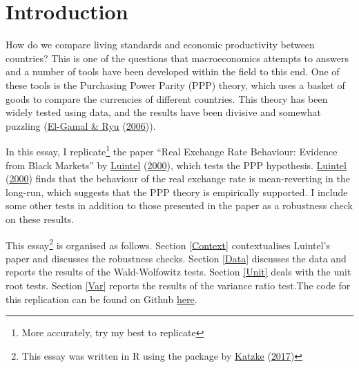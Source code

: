 \documentclass[11pt,preprint, authoryear]{elsarticle}
\numberwithin{equation}{section}
\numberwithin{figure}{section}
\numberwithin{table}{section}
\let\rmarkdownfootnote\footnote%
\def\footnote{\protect\rmarkdownfootnote}
\begin{document}
\renewcommand{\contentsname}{Table of Contents}
{\tableofcontents}

\pagestyle{fancy}
\chead{}
\rhead{}
\lfoot{}
\lhead{}
\cfoot{}


\headsep 35pt %




\newpage

\hypertarget{introduction}{%
\section{\texorpdfstring{Introduction
\label{Introduction}}{Introduction }}\label{introduction}}

How do we compare living standards and economic productivity between
countries? This is one of the questions that macroeconomics attempts to
answers and a number of tools have been developed within the field to
this end. One of these tools is the Purchasing Power Parity (PPP)
theory, which uses a basket of goods to compare the currencies of
different countries. This theory has been widely tested using data, and
the results have been divisive and somewhat puzzling
(\protect\hyperlink{ref-puz}{El-Gamal \& Ryu}
(\protect\hyperlink{ref-puz}{2006})).

In this essay, I replicate\footnote{More accurately, try my best to
  replicate} the paper ``Real Exchange Rate Behaviour: Evidence from
Black Markets'' by \protect\hyperlink{ref-Kul}{Luintel}
(\protect\hyperlink{ref-Kul}{2000}), which tests the PPP hypothesis.
\protect\hyperlink{ref-Kul}{Luintel} (\protect\hyperlink{ref-Kul}{2000})
finds that the behaviour of the real exchange rate is mean-reverting in
the long-run, which suggests that the PPP theory is empirically
supported. I include some other tests in addition to those presented in
the paper as a robustness check on these results.

This essay\footnote{This essay was written in R using the package by
  \protect\hyperlink{ref-Texevier}{Katzke}
  (\protect\hyperlink{ref-Texevier}{2017})} is organised as follows.
Section \ref{Context} contextualises Luintel's paper and discusses the
robustness checks. Section \ref{Data} discusses the data and reports the
results of the Wald-Wolfowitz tests. Section \ref{Unit} deals with the
unit root tests. Section \ref{Var} reports the results of the variance
ratio test.The code for this replication can be found on Github
\href{https://github.com/cass-code/metrics.git}{here}.
\end{document}
